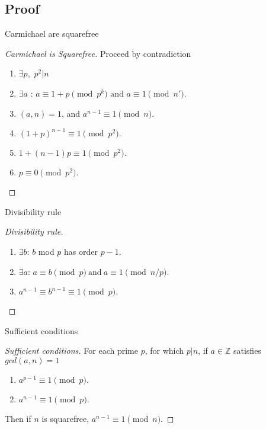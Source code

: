 \documentclass{beamer}
\begin{document}
\subsection{Proof}
\begin{frame}{Carmichael are squarefree}
    \begin{proof}[Carmichael is Squarefree]
    Proceed by contradiction
        \begin{enumerate}
            \item $\exists p$,\  $p^2 |n$
            \pause
            \item $\exists a$ :
                $ a \equiv 1 +p\pmod{p^k}\text{ and } a \equiv 1 \pmod{n'}.$ 
            \pause
            \item $(a, n) = 1$, and $a^{n-1} \equiv 1 \pmod{n}.$
            \pause
            \item $(1+p)^{n-1} \equiv 1 \pmod{p^2}.$
            \pause
            \item $1 + (n-1)p  \equiv 1\pmod{p^2}.$
            \pause
            \item $p  \equiv 0\pmod{p^2}.$
        \end{enumerate}
    \end{proof}
\end{frame}

\begin{frame}{Divisibility rule}
    \begin{proof}[Divisibility rule]
        \begin{enumerate}
            \item $\exists b$: $b$ mod $p$ has order $p-1$.
            \pause
            \item $\exists a$: $ a \equiv b \pmod{p} \ \text{and} \ a \equiv 1 \pmod{n/p}$. 
            \pause
            \item $a^{n-1}\equiv b^{n-1} \equiv 1 \pmod p.$

        \end{enumerate}
    \end{proof}
\end{frame}

\begin{frame}{Sufficient conditions}
\begin{proof}[Sufficient conditions]
    For each prime $p$, for which $p| n$, if $a \in \mathbb{Z}$ satisfies $gcd(a,n)=1$
    \begin{enumerate}
        \item $a^{p-1}\equiv 1 \pmod p.$
        \pause
        \item $a^{n-1}\equiv 1 \pmod p.$
    \end{enumerate}
    \pause
    Then if $n$ is squarefree, $a^{n-1}\equiv 1 \pmod n.$
    \end{proof}
\end{frame}
\end{document}
